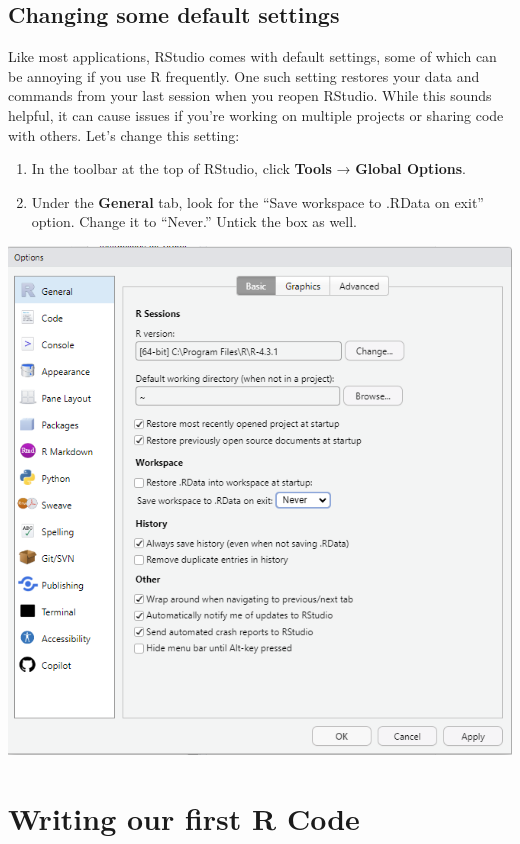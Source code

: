 \documentclass[
]{book}
\begin{document}
\subsection{Changing some default settings}\label{changing-some-default-settings}

Like most applications, RStudio comes with default settings, some of which can be annoying if you use R frequently. One such setting restores your data and commands from your last session when you reopen RStudio. While this sounds helpful, it can cause issues if you're working on multiple projects or sharing code with others. Let's change this setting:

\begin{enumerate}
\def\labelenumi{\arabic{enumi}.}
\item
  In the toolbar at the top of RStudio, click \textbf{Tools} → \textbf{Global Options}.
\item
  Under the \textbf{General} tab, look for the ``Save workspace to .RData on exit'' option. Change it to ``Never.'' Untick the box as well.
\end{enumerate}

\includegraphics{img/01-workspace-setting.PNG}

\section{Writing our first R Code}\label{writing-our-first-r-code}
\end{document}
